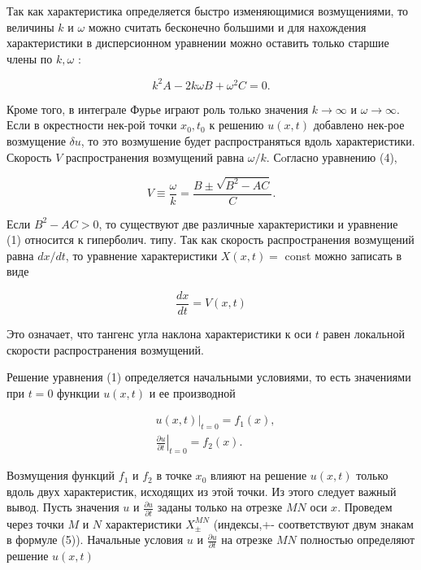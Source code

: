 \documentclass[10pt]{article}
\begin{document}
Так как характеристика определяется быстро изменяющимися возмущениями, то величины $k$ и $\omega$ можно считать бесконечно большими и для нахождения характеристики в дисперсионном уравнении можно оставить только старшие члены по $k, \omega$ :



\[

k^{2} A-2 k \omega B+\omega^{2} C=0 .

\]



Кроме того, в интеграле Фурье играют роль только значения $k \rightarrow \infty$ и $\omega \rightarrow \infty$. Если в окрестности нек-рой точки $x_{0}, t_{0}$ к решению $u(x, t)$ добавлено нек-рое возмущение $\delta u$, то это возмушение будет распространяться вдоль характеристики. Скорость $V$ распространения возмущений равна $\omega / k$. Сoгласно уравнению (4),



\[

V \equiv \frac{\omega}{k}=\frac{B \pm \sqrt{B^{2}-A C}}{C} .

\]



Если $B^{2}-A C>0$, то существуют две различные характеристики и уравнение (1) относится к гиперболич. типу. Так как скорость распространения возмущений равна $d x / d t$, то уравнение характеристики $X(x, t)=$ const можно записать в виде



\[

\frac{d x}{d t}=V(x, t)

\]



Это означает, что тангенс угла наклона характеристики к оси $t$ равен локальной скорости распространения возмущений.



Решение уравнения (1) определяется начальными условиями, то есть значениями при $t=0$ функции $u(x, t)$ и ее производной



\[

\begin{aligned}

& \left.u(x, t)\right|_{t=0}=f_{1}(x), \\

& \left.\frac{\partial u}{\partial t}\right|_{t=0}=f_{2}(x) .

\end{aligned}

\]



Возмущения функций $f_{1}$ и $f_{2}$ в точке $x_{0}$ влияют на решение $u(x, t)$ только вдоль двух характеристик, исходящих из этой точки. Из этого следует важный вывод. Пусть значения $u$ и $\frac{\partial u}{\partial t}$ заданы только на отрезке $M N$ оси $x$. Проведем через точки $M$ и $N$ характеристики $X_{ \pm}^{M N}$ (индексы,+- соответствуют двум знакам в формуле (5)). Начальные условия $u$ и $\frac{\partial u}{\partial t}$ на отрезке $M N$ полностью определяют решение $u(x, t)$
\end{document}
